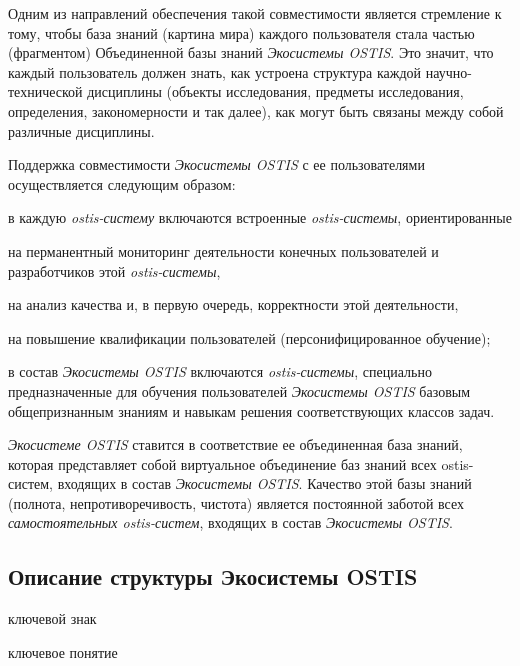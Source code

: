 Одним из направлений обеспечения такой совместимости является стремление к тому, чтобы база знаний (картина мира) каждого пользователя стала частью (фрагментом) Объединенной базы знаний \textit{Экосистемы OSTIS}. Это значит, что каждый пользователь должен знать, как устроена структура каждой научно-технической дисциплины (объекты исследования, предметы исследования, определения, закономерности и так далее), как могут быть связаны между собой различные дисциплины.

Поддержка совместимости \textit{Экосистемы OSTIS} с ее пользователями осуществляется следующим образом:
\begin{textitemize}
    \item в каждую \textit{ostis-систему} включаются встроенные \textit{ostis-системы}, ориентированные
    \begin{textitemize}
        \item на перманентный мониторинг деятельности конечных пользователей и разработчиков этой \textit{ostis-системы},
        \item на анализ качества и, в первую очередь, корректности этой деятельности,
        \item на повышение квалификации пользователей (персонифицированное обучение);
    \end{textitemize}
    \item в состав \textit{Экосистемы OSTIS} включаются \textit{ostis-системы}, специально предназначенные для обучения пользователей \textit{Экосистемы OSTIS} базовым общепризнанным знаниям и навыкам решения соответствующих классов задач.
\end{textitemize}

\textit{Экосистеме OSTIS} ставится в соответствие ее объединенная база знаний, которая представляет собой виртуальное объединение баз знаний всех ostis-систем, входящих в состав \textit{Экосистемы OSTIS}.
Качество этой базы знаний (полнота, непротиворечивость, чистота) является постоянной заботой всех \textit{самостоятельных ostis-систем}, входящих в состав \textit{Экосистемы OSTIS}.


\subsection{Описание структуры Экосистемы OSTIS}
{\label{sec_ecosystem_structure_description}} 

\begin{SCn}
\begin{scnrelfromlist}{ключевой знак}
\end{scnrelfromlist}

\begin{scnrelfromlist}{ключевое понятие}
\end{scnrelfromlist}
\end{SCn}

